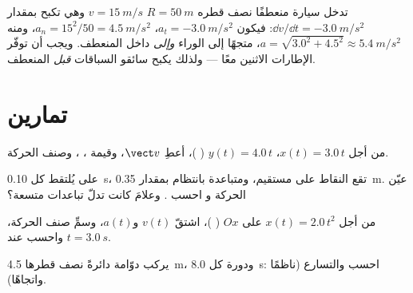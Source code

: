 \begin{example}\label{ex:g12:kinematics-2d:bend}
تدخل سيارة منعطفًا نصف قطره $R = \qty{50}{m}$  $v = \qty{15}{m/s}$
وهي تكبح بمقدار $\dd v/\dd t = \qty{-3.0}{m/s^2}$: فيكون $a_t =
\qty{-3.0}{m/s^2}$، $a_n = 15^2/50 = \qty{4.5}{m/s^2}$، ومنه $a =
\sqrt{3.0^2 + 4.5^2} \approx \qty{5.4}{m/s^2}$، متجهًا إلى الوراء
\emph{وإلى} داخل المنعطف. ويجب أن توفّر الإطارات الاثنين معًا ---
ولذلك يكبح سائقو السباقات \emph{قبل} المنعطف.
\end{example}

\section{تمارين}

\begin{exercise}[$\star$]\label{exo:g12:kinematics-2d:1}
من أجل $x(t) = 3.0\,t$، $y(t) = 4.0\,t$ ( )، أعطِ
$\vect v$، وقيمة ، ، وصنف الحركة.
\end{exercise}

\begin{exercise}[$\star$]\label{exo:g12:kinematics-2d:2}
على  يُلتقط كل \qty{0.10}{s}، تقع النقاط على
مستقيم، ومتباعدة بانتظام بمقدار \qty{0.35}{m}. عيّن الحركة و
احسب . وعلامَ كانت تدلّ تباعدات متسعة؟
\end{exercise}

\begin{exercise}[$\star$]\label{exo:g12:kinematics-2d:3}
من أجل $x(t) = 2.0\,t^2$ على $Ox$ ( )، اشتقّ $v(t)$
و$a(t)$، وسمِّ صنف الحركة، واحسب  عند
$t = \qty{3.0}{s}$.
\end{exercise}

\begin{exercise}[$\star$]\label{exo:g12:kinematics-2d:4}
يركب  دوّامة دائرةً نصف قطرها \qty{4.5}{m}، ودورة كل
\qty{8.0}{s}: احسب   والتسارع
(ناظمًا واتجاهًا).
\end{exercise}

